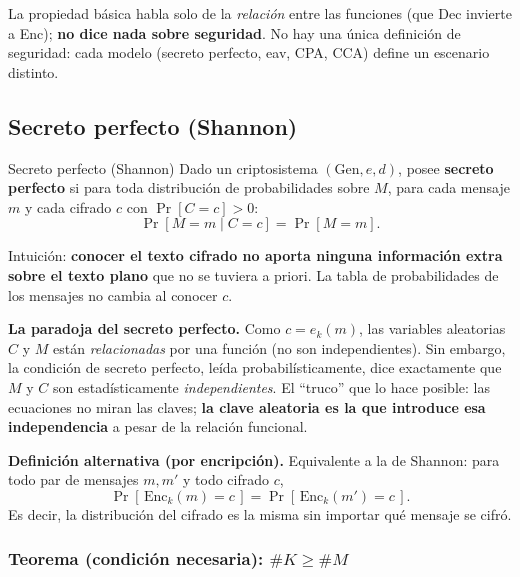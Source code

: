 \documentclass[../main.tex]{subfiles}
\begin{document}
\begin{ojo}
La propiedad básica habla solo de la \emph{relación} entre las funciones
(que Dec invierte a Enc); \textbf{no dice nada sobre seguridad}. No hay una
única definición de seguridad: cada modelo (secreto perfecto, eav, CPA, CCA)
define un escenario distinto.
\end{ojo}

\subsection{Secreto perfecto (Shannon)}

\begin{definicion}{Secreto perfecto (Shannon)}
Dado un criptosistema $(\text{Gen}, e, d)$, posee \textbf{secreto perfecto} si
para toda distribución de probabilidades sobre $M$, para cada mensaje $m$ y
cada cifrado $c$ con $\Pr[C=c]>0$:
$$\Pr[M=m \mid C=c] = \Pr[M=m].$$
\end{definicion}

Intuición: \textbf{conocer el texto cifrado no aporta ninguna información
extra sobre el texto plano} que no se tuviera a priori. La tabla de
probabilidades de los mensajes no cambia al conocer $c$.

\begin{destacado}
\textbf{La paradoja del secreto perfecto.} Como $c=e_k(m)$, las variables
aleatorias $C$ y $M$ están \emph{relacionadas} por una función (no son
independientes). Sin embargo, la condición de secreto perfecto, leída
probabilísticamente, dice exactamente que $M$ y $C$ son estadísticamente
\emph{independientes}. El ``truco'' que lo hace posible: las ecuaciones no
miran las claves; \textbf{la clave aleatoria es la que introduce esa
independencia} a pesar de la relación funcional.
\end{destacado}

\textbf{Definición alternativa (por encripción).} Equivalente a la de Shannon:
para todo par de mensajes $m, m'$ y todo cifrado $c$,
$$\Pr[\,\text{Enc}_k(m)=c\,] = \Pr[\,\text{Enc}_k(m')=c\,].$$
Es decir, la distribución del cifrado es la misma sin importar qué mensaje se
cifró.

\subsubsection{Teorema (condición necesaria): $\#K \ge \#M$}
\end{document}
